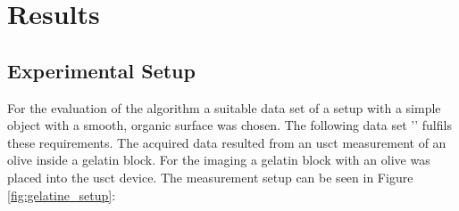 \chapter{Results}
\label{chap:results}




\section{Experimental Setup}
\label{sec:input_data}


For the evaluation of the algorithm a suitable data set of a setup with a simple object with a smooth, organic surface was chosen. The following data set '' fulfils these requirements. The acquired data resulted from an \ac{usct} measurement of an olive inside a gelatin block. For the imaging a gelatin block with an olive was placed into the \ac{usct} device. 
The measurement setup can be seen in Figure \ref{fig:gelatine_setup}:


